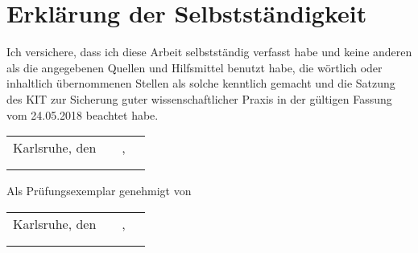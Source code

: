 \chapter*{Erklärung der Selbstständigkeit}
Ich versichere, dass ich diese Arbeit selbstständig verfasst habe und keine %
anderen als die angegebenen Quellen und Hilfsmittel benutzt habe, die %
wörtlich oder inhaltlich übernommenen Stellen als solche kenntlich gemacht und %
die Satzung des KIT zur Sicherung guter wissenschaftlicher Praxis in der %
gültigen Fassung vom 24.05.2018 beachtet habe.\\

\vspace{1cm}

\renewcommand{\arraystretch}{0} %

\begin{flushright}
	\begin{tabular}{rrrr}
		Karlsruhe, den &\hspace*{3cm}&, \hspace*{1mm} & \hspace*{5cm}\\[0mm]
		\cline{2-2}\cline{4-4}\\[2mm]    %
		& & & \thesisauthor  %
	\end{tabular}
\end{flushright}

\vfill

\begin{flushright}
	Als Prüfungsexemplar genehmigt von\\
	\vspace{1cm}
	\begin{tabular}{rrrr}
		Karlsruhe, den &\hspace*{3cm}&, \hspace*{1mm} & \hspace*{5cm}\\[0mm]
		\cline{2-2}\cline{4-4}\\[2mm]    %
		& & & \thesisreviewerone  %
	\end{tabular}
\end{flushright}

\renewcommand{\arraystretch}{1}

\cleardoublepage
